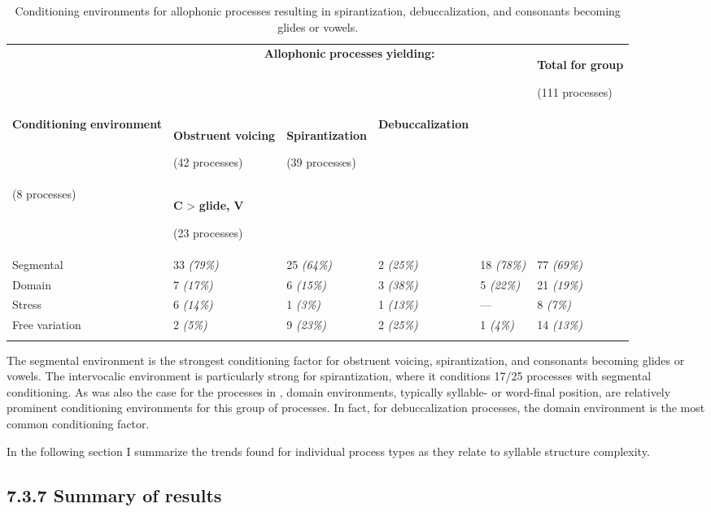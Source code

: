 \begin{table}
\begin{tabularx}{\textwidth}{XXXXXX}
\lsptoprule
 & \multicolumn{4}{c}{ \textbf{Allophonic} \textbf{processes} \textbf{yielding:}} & { \textbf{Total} \textbf{for} \textbf{group}}

 (111 processes)\\
 \textbf{Conditioning} \textbf{environment} & { \textbf{Obstruent} \textbf{voicing}}

 (42 processes) & { \textbf{Spirantization}}

 (39 processes) & \textbf{Debuccalization}\\
(8 processes) & { \textbf{C} > \textbf{glide,} \textbf{V}}

 (23 processes) & \\
 Segmental & 33 \textit{(79\%)} & 25 \textit{(64\%)} & 2 \textit{(25\%)} & 18 \textit{(78\%)} & 77 \textit{(69\%)}\\
 Domain & 7 \textit{(17\%)} & 6 \textit{(15\%)} & 3 \textit{(38\%)} & 5 \textit{(22\%)} & 21 \textit{(19\%)}\\
 Stress & 6 \textit{(14\%)} & 1 \textit{(3\%)} & 1 \textit{(13\%)} & — & 8 \textit{(7\%)}\\
 Free variation & 2 \textit{(5\%)} & 9 \textit{(23\%)} & 2 \textit{(25\%)} & 1 \textit{(4\%)} & 14 \textit{(13\%)}\\
\lspbottomrule
\end{tabularx}
\caption{\label{7.6}Conditioning environments for allophonic processes resulting in spirantization, debuccalization, and consonants becoming glides or vowels.}
\end{table}

  The segmental environment is the strongest conditioning factor for obstruent voicing, spirantization, and consonants becoming glides or vowels. The intervocalic environment is particularly strong for spirantization, where it conditions 17/25 processes with segmental conditioning. As was also the case for the processes in , domain environments, typically syllable- or word-final position, are relatively prominent conditioning environments for this group of processes. In fact, for debuccalization processes, the domain environment is the most common conditioning factor.

  In the following section I summarize the trends found for individual process types as they relate to syllable structure complexity.

\subsection{7.3.7 Summary of results} 

